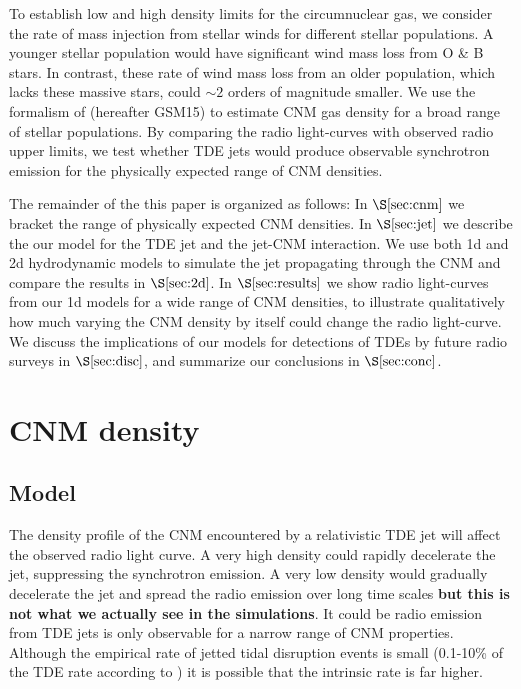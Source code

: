 \documentclass[usenatbib,fleqn]{mn2e}
\begin{document}
To establish low and high density limits for the circumnuclear gas, we
consider the rate of mass injection from stellar winds for different
stellar populations. A younger stellar population would have
significant wind mass loss from O \& B stars. In contrast, these rate
of wind mass loss from an older population, which lacks these massive
stars, could $\sim 2$ orders of magnitude smaller. We use the
formalism of \citet{Generozov+2015} (hereafter GSM15) to estimate CNM
gas density for a broad range of stellar populations. By comparing the
radio light-curves with observed radio upper limits, we test whether
TDE jets would produce observable synchrotron emission for the
physically expected range of CNM densities.

The remainder of the this paper is organized as follows: In
$\S\ref{sec:cnm}$ we bracket the range of physically expected CNM
densities. In $\S\ref{sec:jet}$ we describe the our model for the TDE
jet and the jet-CNM interaction. We use both 1d and 2d hydrodynamic
models to simulate the jet propagating through the CNM and compare the
results in $\S\ref{sec:2d}$. In $\S\ref{sec:results}$ we show radio
light-curves from our 1d models for a wide range of CNM densities, to
illustrate qualitatively how much varying the CNM density by itself
could change the radio light-curve.  We discuss the implications of
our models for detections of TDEs by future radio surveys in
$\S\ref{sec:disc}$, and summarize our conclusions in
$\S\ref{sec:conc}$.

\section{CNM density}
\label{sec:cnm}

\subsection{Model}

The density profile of the CNM encountered by a relativistic TDE jet
will affect the observed radio light curve. A very high density could
rapidly decelerate the jet, suppressing the synchrotron emission. A
very low density would gradually decelerate the jet and spread the
radio emission over long time scales \citep{Mimica+2015} {\bf but this
is not what we actually see in the simulations}.  It could be 
radio emission from TDE jets is only observable for a narrow range of
CNM properties. Although the empirical rate of jetted tidal disruption
events is small (0.1-10\% of the TDE rate according to
\citealt{van-Velzen+2013}) it is possible that the intrinsic rate is
far higher.
\end{document}
